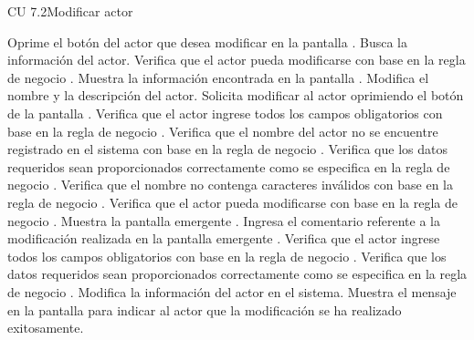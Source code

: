 \begin{UseCase}{CU 7.2}{Modificar actor}
{\begin{UClist}
		\end{UClist}
	}

\end{UseCase}
 \begin{UCtrayectoria}
	\UCpaso[\UCactor] Oprime el botón \btnEditar del actor que desea modificar en la pantalla .
	\UCpaso[\UCsist] Busca la información del actor.
	\UCpaso[\UCsist] Verifica que el actor pueda modificarse con base en la regla de negocio . 
    \UCpaso[\UCsist] Muestra la información encontrada en la pantalla .
    \UCpaso[\UCactor] Modifica el nombre y la descripción del actor. \label{cu7.2:ingresaDatos}
    \UCpaso[\UCactor] Solicita modificar al actor oprimiendo el botón  de la pantalla .  
    \UCpaso[\UCsist] Verifica que el actor ingrese todos los campos obligatorios con base en la regla de negocio  . 
    \UCpaso[\UCsist] Verifica que el nombre del actor no se encuentre registrado en el sistema con base en la regla de negocio  . 
    \UCpaso[\UCsist] Verifica que los datos requeridos sean proporcionados correctamente como se especifica en la regla de negocio .  
    \UCpaso[\UCsist] Verifica que el nombre no contenga caracteres inválidos con base en la regla de negocio . 
	\UCpaso[\UCsist] Verifica que el actor pueda modificarse con base en la regla de negocio . 
	\UCpaso[\UCsist] Muestra la pantalla emergente .
	\UCpaso[\UCactor] Ingresa el comentario referente a la modificación realizada en la pantalla emergente . \label{cu7.2:ingresaComentario}
    \UCpaso[\UCsist] Verifica que el actor ingrese todos los campos obligatorios con base en la regla de negocio  . 
    \UCpaso[\UCsist] Verifica que los datos requeridos sean proporcionados correctamente como se especifica en la regla de negocio . 
    \UCpaso[\UCsist] Modifica la información del actor en el sistema.
    \UCpaso[\UCsist] Muestra el mensaje  en la pantalla 
    para indicar al actor que la modificación se ha realizado exitosamente.
 \end{UCtrayectoria}
 
